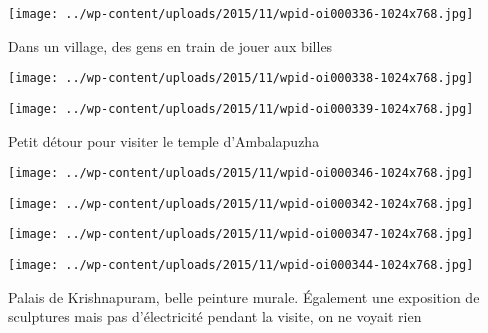 \begin{center} \texttt{[image: ../wp-content/uploads/2015/11/wpid-oi000336-1024x768.jpg]} \end{center}

 

 Dans un village, des gens en train de jouer aux billes 

 

\begin{center} \texttt{[image: ../wp-content/uploads/2015/11/wpid-oi000338-1024x768.jpg]} \end{center}

 

 

\begin{center} \texttt{[image: ../wp-content/uploads/2015/11/wpid-oi000339-1024x768.jpg]} \end{center}

 

 Petit détour pour visiter le temple d'Ambalapuzha 

 

\begin{center} \texttt{[image: ../wp-content/uploads/2015/11/wpid-oi000346-1024x768.jpg]} \end{center}

 

 

\begin{center} \texttt{[image: ../wp-content/uploads/2015/11/wpid-oi000342-1024x768.jpg]} \end{center}

 

 

\begin{center} \texttt{[image: ../wp-content/uploads/2015/11/wpid-oi000347-1024x768.jpg]} \end{center}

 

 

\begin{center} \texttt{[image: ../wp-content/uploads/2015/11/wpid-oi000344-1024x768.jpg]} \end{center}

 

 Palais de Krishnapuram, belle peinture murale. Également une exposition de sculptures mais pas d'électricité pendant la visite, on ne voyait rien 

